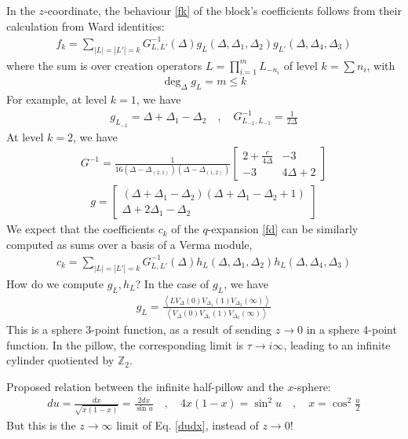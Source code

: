\documentclass[12pt,a4paper]{article}
\begin{document}
In the $z$-coordinate, the behaviour \eqref{fk} of the block's coefficients follows from their calculation from Ward identities:
\begin{align}
 f_k = \sum_{|L|=|L'|=k} G^{-1}_{L,L'}(\Delta) g_L(\Delta,\Delta_1,\Delta_2)g_{L'}(\Delta,\Delta_4,\Delta_3)
\end{align}
where the sum is over creation operators $L=\prod_{i=1}^m L_{-n_i}$ of level $k=\sum n_i$, with 
\begin{align}
 \deg_\Delta g_L = m\leq k
\end{align}
For example, at level $k=1$, we have 
\begin{align}
 g_{L_{-1}} = \Delta + \Delta_1-\Delta_2 \quad , \quad G^{-1}_{L_{-1},L_{-1}} = \frac{1}{2\Delta} 
\end{align}
At level $k=2$, we have 
\begin{align}
G^{-1} = \frac{1}{16(\Delta-\Delta_{(2,1)})(\Delta-\Delta_{(1,2)})} \begin{bmatrix} 2+\frac{c}{4\Delta} & -3 \\ -3 & 4\Delta+2 \end{bmatrix}
\end{align}
\begin{align}
 g = \begin{bmatrix} (\Delta+\Delta_1-\Delta_2)(\Delta+\Delta_1-\Delta_2+1) \\ \Delta+2\Delta_1-\Delta_2 \end{bmatrix}
\end{align}
We expect that the coefficients $c_k$ of the $q$-expansion \eqref{fd} can be similarly computed as sums over a basis of a Verma module, 
\begin{align}
 c_k = \sum_{|L|=|L'|=k} G^{-1}_{L,L'}(\Delta) h_L(\Delta,\Delta_1,\Delta_2)h_L(\Delta,\Delta_4,\Delta_3)
 \label{ghh}
\end{align}
How do we compute $g_L,h_L$? In the case of $g_L$, we have 
\begin{align}
 g_L = \frac{\left< LV_{\Delta}(0)V_{\Delta_1}(1)V_{\Delta_2}(\infty)\right>}{\left< V_{\Delta}(0)V_{\Delta_1}(1)V_{\Delta_2}(\infty)\right>}
\end{align}
This is a sphere 3-point function, as a result of sending $z\to 0$ in a sphere 4-point function. In the pillow, the corresponding limit is $\tau\to i\infty$, leading to an infinite cylinder quotiented by $\mathbb{Z}_2$. 

Proposed relation between the infinite half-pillow and the $x$-sphere:
\begin{align}
 du = \frac{dx}{\sqrt{x(1-x)}} = \frac{2dx}{\sin u} \quad , \quad 4x(1-x) = \sin^2u \quad , \quad x = \cos^2\tfrac{u}{2}
\end{align}
But this is the $z\to\infty$ limit of Eq. \eqref{dudx}, instead of $z\to 0$! 
\end{document}
